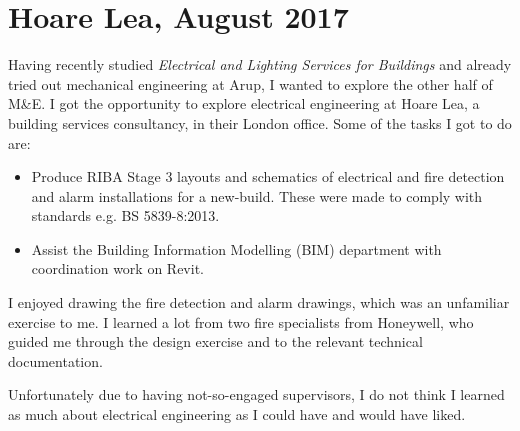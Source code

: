 

\section{Hoare Lea, August 2017}


Having recently studied \textit{Electrical and Lighting Services for Buildings} and already tried out mechanical engineering at Arup, I wanted to explore the other half of M\&E.
I got the opportunity to explore electrical engineering at Hoare Lea, a building services consultancy, in their London office.
Some of the tasks I got to do are:
\begin{itemize}%
	\item Produce RIBA Stage 3 layouts and schematics of electrical and fire detection and alarm installations for a new-build. These were made to comply with standards e.g. BS 5839-8:2013.
	\item Assist the Building Information Modelling (BIM) department with coordination work on Revit.
\end{itemize}

I enjoyed drawing the fire detection and alarm drawings, which was an unfamiliar exercise to me.
I learned a lot from two fire specialists from Honeywell, who guided me through the design exercise and to the relevant technical documentation.

Unfortunately due to having not-so-engaged supervisors, I do not think I learned as much about electrical engineering as I could have and would have liked.




